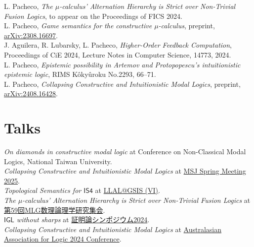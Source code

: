 \documentclass[11pt, a4paper]{article}
\newcommand{\years}[1]{\marginnote{\scriptsize #1}}
\begin{document}
L. Pacheco, \emph{The $\mu$-calculus' Alternation Hierarchy is Strict over Non-Trivial Fusion Logics}, to appear on the Proceedings of FICS 2024. \\

L. Pacheco, \emph{Game semantics for the constructive $\mu$-calculus}, preprint, \href{https://arxiv.org/abs/2308.16697}{arXiv:2308.16697}. \\

J. Aguilera, R. Lubarsky, L. Pacheco, \emph{Higher-Order Feedback Computation}, Proceedings of CiE 2024, Lecture Notes in Computer Science, 14773, 2024. \\

L. Pacheco, \emph{Epistemic possibility in Artemov and Protopopescu’s intuitionistic epistemic logic}, RIMS Kôkyûroku No.2293, 66--71. \\

L. Pacheco, \emph{Collapsing Constructive and Intuitionistic Modal Logics}, preprint, \href{https://arxiv.org/abs/2408.16428}{arXiv:2408.16428}.

\newpage
\section*{Talks}

\years{2025} \emph{On diamonds in constructive modal logic} at Conference on Non-Classical Modal Logics, National Taiwan University.\\

\years{2025} \emph{Collapsing Constructive and Intuitionistic Modal Logics} at \href{https://www.mathsoc.jp/en/meeting/waseda25mar/}{MSJ Spring Meeting 2025}.\\

\years{2025} \emph{Topological Semantics for \(\mathsf{IS4}\)} at \href{https://sites.google.com/view/llal-at-gsis/meetings/llalgsis-6}{LLAL@GSIS (VI)}.\\

\years{2025} \emph{The \(\mu\)-calculus' Alternation Hierarchy is Strict over Non-Trivial Fusion Logics} at \href{https://sites.google.com/view/mlg59}{第59回MLG数理論理学研究集会}.\\

\years{2024} \emph{\(\mathsf{IGL}\) without sharps} at \href{https://sites.google.com/view/proof-theory-2024/home}{証明論シンポジウム2024}.\\

\years{2024} \emph{Collapsing Constructive and Intuitionistic Modal Logics} at \href{https://sites.google.com/view/aalogic/aal-conference-2024}{Australasian Association for Logic 2024 Conference}.\\
\end{document}

